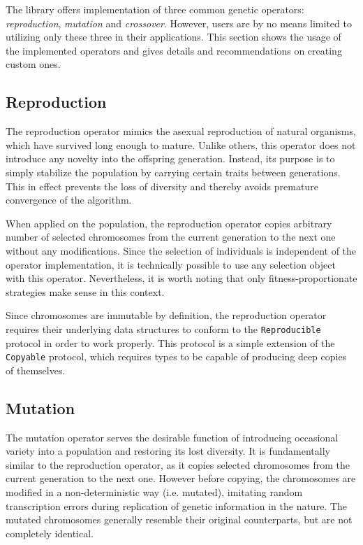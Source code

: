 The library offers implementation of three common genetic operators: \textit{reproduction}, \textit{mutation} and \textit{crossover}. However, users are by no means limited to utilizing only these three in their applications. This section shows the usage of the implemented operators and gives details and recommendations on creating custom ones.

\subsection{Reproduction}\label{section:reproduction}
The reproduction operator mimics the asexual reproduction of natural organisms, which have survived long enough to mature. Unlike others, this operator does not introduce any novelty into the offspring generation. Instead, its purpose is to simply stabilize the population by carrying certain traits between generations. This in effect prevents the loss of diversity and thereby avoids premature convergence of the algorithm.

When applied on the population, the reproduction operator copies arbitrary number of selected chromosomes from the current generation to the next one without any modifications. Since the selection of individuals is independent of the operator implementation, it is technically possible to use any selection object with this operator. Nevertheless, it is worth noting that only fitness-proportionate strategies make sense in this context.

Since chromosomes are immutable by definition, the reproduction operator requires their underlying data structures to conform to the \texttt{Reproducible} protocol in order to work properly. This protocol is a simple extension of the \texttt{Copyable} protocol, which requires types to be capable of producing deep copies of themselves.

\subsection{Mutation}\label{section:mutation}
The mutation operator serves the desirable function of introducing occasional variety into a population and restoring its lost diversity. \cite{Koza1992} It is fundamentally similar to the reproduction operator, as it copies selected chromosomes from the current generation to the next one. However before copying, the chromosomes are modified in a non-deterministic way (i.e. mutated), imitating random transcription errors during replication of genetic information in the nature. The mutated chromosomes generally resemble their original counterparts, but are not completely identical.

